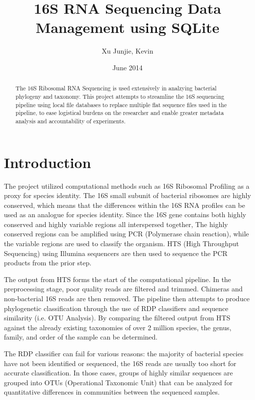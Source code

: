 \documentclass[12pt]{article}
\begin{document}
	\title{16S RNA Sequencing Data Management using SQLite}
	\author{Xu Junjie, Kevin}
	\date{June 2014}
	\maketitle
	\begin{abstract}
		The 16S Ribosomal RNA Sequencing is used extensively in analzying bacterial
		phylogeny and taxonomy. This project attempts to streamline the 16S sequencing
		pipeline using local file databases to replace multiple flat sequence files used
		in the pipeline, to ease logistical burdens on the researcher and enable 
		greater metadata analysis and accountability of experiments.
	\end{abstract}
	\tableofcontents
	\section{Introduction} %
	\label{sec:introduction}
	The project utilized computational methods such as 16S Ribosomal Profiling as a proxy for species identity. The 16S small subunit of bacterial ribosomes are highly conserved, which means that the differences within the 16S RNA profiles can be used as an analogue for species identity. Since the 16S gene contains both highly conserved and highly variable regions all interspersed together,
	The highly conserved regions can be amplified using PCR (Polymerase chain reaction), while the variable regions are used to classify the organism. HTS (High Throughput Sequencing) using Illumina sequencers are then used to sequence the PCR products from the prior step.

	The output from HTS forms the start of the computational pipeline. In the preprocessing stage, poor quality reads are filtered and trimmed. Chimeras and non-bacterial 16S reads are then removed. The pipeline then attempts to produce phylogenetic classification through the use of RDP classifiers and sequence similarity (i.e. OTU Analysis). By comparing the filtered output from HTS against the already existing taxonomies of over 2 million species, the genus, family, and order of the sample can be determined.

	The RDP classifier can fail for various reasons: the majority of bacterial species have not been identified or sequenced, the 16S reads are usually too short for accurate classification. In those cases, groups of highly similar sequences are grouped into OTUs (Operational Taxonomic Unit) that can be analyzed for
	quantitative differences in communities between the sequenced samples.
\end{document}
